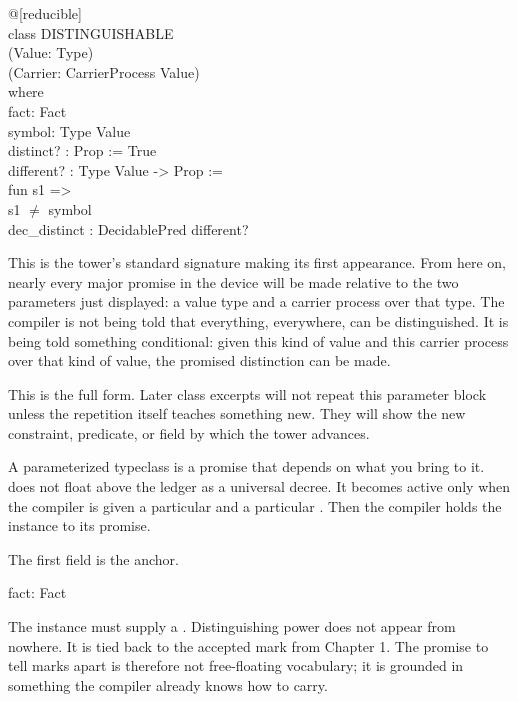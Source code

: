 \begin{leancode}
@[reducible]\\
class DISTINGUISHABLE\\
\quad (Value: Type)\\
\quad (Carrier: CarrierProcess Value)\\
\quad where\\
\quad fact: Fact\\
\quad symbol: Type Value\\
\quad distinct? : Prop := True\\
\quad different? : Type Value -> Prop :=\\
\quad\quad fun s1 =>\\
\quad\quad\quad s1 \(\neq\) symbol\\
\quad dec\_distinct : DecidablePred different?
\end{leancode}

This is the tower's standard signature making its first appearance. From here
on, nearly every major promise in the device will be made relative to the two
parameters just displayed: a value type and a carrier process over that type.
The compiler is not being told that everything, everywhere, can be
distinguished. It is being told something conditional: given this kind of value
and this carrier process over that kind of value, the promised distinction can
be made.

This is the full form. Later class excerpts will not repeat this parameter
block unless the repetition itself teaches something new. They will show the
new constraint, predicate, or field by which the tower advances.

A parameterized typeclass is a promise that depends on what you bring to it.
 does not float above the ledger as a universal decree.
It becomes active only when the compiler is given a particular  and
a particular . Then the compiler holds the instance to its
promise.

The first field is the anchor.

\begin{leancode}
fact: Fact
\end{leancode}

The instance must supply a . Distinguishing power does not appear
from nowhere. It is tied back to the accepted mark from Chapter 1. The promise
to tell marks apart is therefore not free-floating vocabulary; it is grounded
in something the compiler already knows how to carry.


